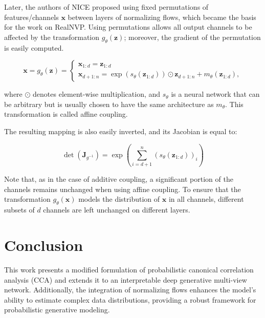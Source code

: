 \documentclass[a4paper,12pt]{article}
\theoremstyle{plain} %
\theoremstyle{definition} %
\theoremstyle{remark} %
\begin{document}
Later, the authors of NICE proposed using fixed permutations of features/channels $\boldsymbol{x}$ between layers of normalizing flows, which became the basis for the work on RealNVP. Using permutations allows all output channels to be affected by the transformation $g_\theta(\boldsymbol{z})$; moreover, the gradient of the permutation is easily computed.

\[
\boldsymbol{x} = g_\theta(\boldsymbol{z}) = \begin{cases}
\boldsymbol{x}_{1:d} = \boldsymbol{z}_{1:d} \\
\boldsymbol{x}_{d+1:n} = \exp(s_\theta(\boldsymbol{z}_{1:d})) \odot \boldsymbol{z}_{d+1:n} + m_\theta(\boldsymbol{z}_{1:d}),
\end{cases}
\]

where $\odot$ denotes element-wise multiplication, and $s_\theta$ is a neural network that can be arbitrary but is usually chosen to have the same architecture as $m_\theta$. This transformation is called affine coupling.

The resulting mapping is also easily inverted, and its Jacobian is equal to:

\[
\det(\boldsymbol{J}_{g^{-1}}) = \exp \left( \sum_{i=d+1}^n (s_\theta(\boldsymbol{z}_{1:d}))_i \right)
\]

Note that, as in the case of additive coupling, a significant portion of the channels remains unchanged when using affine coupling. To ensure that the transformation $g_\theta(\boldsymbol{x})$ models the distribution of $\boldsymbol{x}$ in all channels, different subsets of $d$ channels are left unchanged on different layers.
 

\section*{Conclusion} 

This work presents a modified formulation of probabilistic canonical correlation analysis (CCA) and extends it to an interpretable deep generative multi-view network. Additionally, the integration of normalizing flows enhances the model's ability to estimate complex data distributions, providing a robust framework for probabilistic generative modeling.




\end{document}
